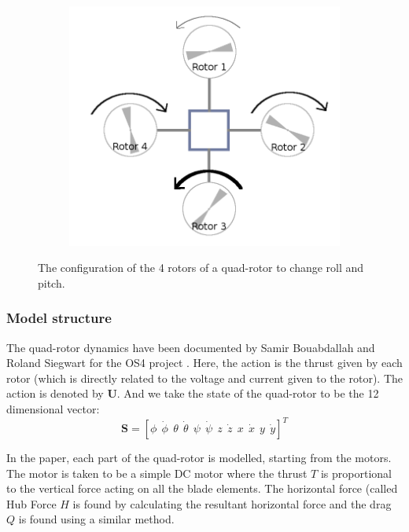 \documentclass[hidelinks,BTech]{iitmdiss}
\begin{document}
\begin{figure}[H]
\begin{subfigure}[c]{0.45\textwidth}
        \includegraphics[width=\textwidth]{quadrotor_rotors_pitch.png}
        \caption{}
    \end{subfigure}
    \caption{The configuration of the 4 rotors of a quad-rotor to change roll and pitch.}
\end{figure}

\subsubsection{Model structure}

The quad-rotor dynamics have been documented by Samir Bouabdallah and Roland Siegwart for the OS4 project \cite{QuadrotorDynamics}. Here, the action is the thrust given by each rotor (which is directly related to the voltage and current given to the rotor). The action is denoted by $\mathbf{U}$. And we take the state of the quad-rotor to be the 12 dimensional vector:
\begin{equation}
  \mathbf{S} = \left[\phi\ \ \dot{\phi}\ \ \theta\ \ \dot{\theta}\ \ \psi\ \ \dot{\psi}\ \ z\ \ \dot{z}\ \ x\ \ \dot{x}\ \ y\ \ \dot{y}\right]^{T}
\end{equation}

In the paper, each part of the quad-rotor is modelled, starting from the motors. The motor is taken to be a simple DC motor where the thrust $T$ is proportional to the vertical force acting on all the blade elements. The horizontal force (called Hub Force $H$ is found by calculating the resultant horizontal force and the drag $Q$ is found using a similar method.
\end{document}

